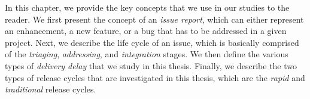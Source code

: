 In this chapter, we provide the key concepts that we use in our studies to the
reader. We first present the concept of an {\em issue report}, which can either
represent an enhancement, a new feature, or a bug that has to be addressed in a
given project. Next, we describe the life cycle of an issue, which is basically
comprised of the {\em triaging}, {\em addressing}, and {\em integration} stages.
We then define the various types of {\em delivery delay} that we study in this
thesis. Finally, we describe the two types of release cycles that are
investigated in this thesis, which are the {\em rapid} and {\em traditional}
release cycles.


